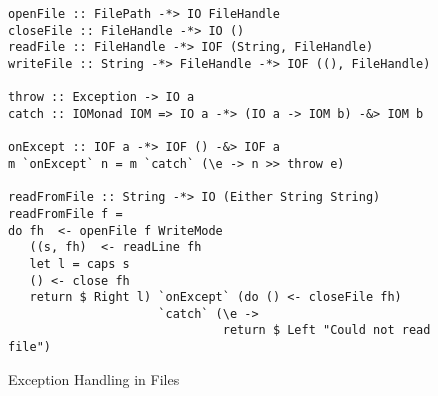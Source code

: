 \begin{figure}[h]
  \begin{framed}
    \begin{verbatim}
openFile :: FilePath -*> IO FileHandle
closeFile :: FileHandle -*> IO ()
readFile :: FileHandle -*> IOF (String, FileHandle)
writeFile :: String -*> FileHandle -*> IOF ((), FileHandle)

throw :: Exception -> IO a
catch :: IOMonad IOM => IO a -*> (IO a -> IOM b) -&> IOM b

onExcept :: IOF a -*> IOF () -&> IOF a
m `onExcept` n = m `catch` (\e -> n >> throw e)

readFromFile :: String -*> IO (Either String String)
readFromFile f =
do fh  <- openFile f WriteMode
   ((s, fh)  <- readLine fh
   let l = caps s
   () <- close fh
   return $ Right l) `onExcept` (do () <- closeFile fh)
                     `catch` (\e ->
                              return $ Left "Could not read file")
    \end{verbatim}
  \end{framed}
  \caption{Exception Handling in Files}
  \label{fig:file-exceptions}
\end{figure}















